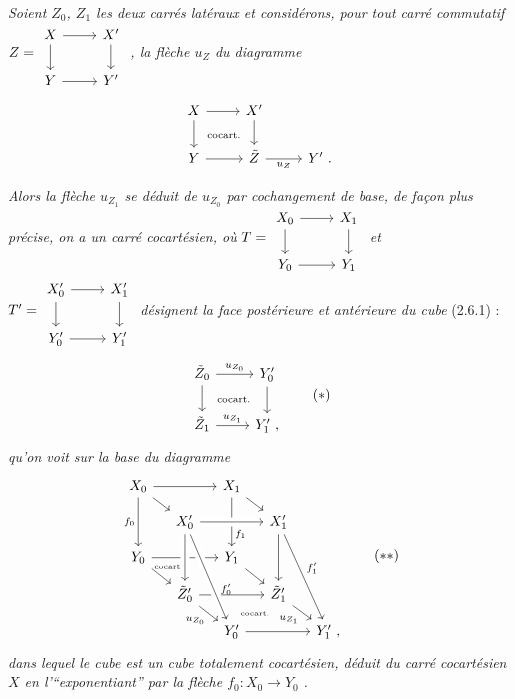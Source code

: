 \documentclass[11pt]{article}
\newcommand{\printedpage}[1]{\marginpar{\footnotesize p.~#1\ifstrequal{#1}{1}{\\[2pt]{[page 1]}}{}}}
\newcommand{\msp}[1]{\ifstrequal{#1}{page 1}{}{\marginpar{\footnotesize [#1]}}}
\begin{document}
\textit{Soient $Z_0$, $Z_1$ les deux carrés latéraux et considérons, pour tout carré commutatif}
$Z = \begin{tikzcd}[ampersand replacement=\&, baseline=(\tikzcdmatrixname.center)]
X \arrow[r] \arrow[d] \& X' \arrow[d] \\
Y \arrow[r] \& Y'
\end{tikzcd}$ \textit{, la flèche $u_Z$ du diagramme}
\[
\begin{tikzcd}
X \arrow[r] \arrow[d] \arrow[dr, phantom, "\text{\scriptsize cocart.}"] & X' \arrow[d] & \\
Y \arrow[r] & \tilde{Z} \arrow[r, "u_Z"'] & Y' \ .
\end{tikzcd}
\]

\printedpage{18}

\msp{page 32}

\textit{Alors la flèche $u_{Z_1}$ se déduit de $u_{Z_0}$ par cochangement de base, de façon plus précise, on a un carré cocartésien, où} $T = \begin{tikzcd}[ampersand replacement=\&, baseline=(\tikzcdmatrixname.center)]
X_0 \arrow[r] \arrow[d] \& X_1 \arrow[d] \\
Y_0 \arrow[r] \& Y_1
\end{tikzcd}$ \textit{et} $T' = \begin{tikzcd}[ampersand replacement=\&, baseline=(\tikzcdmatrixname.center)]
X'_0 \arrow[r] \arrow[d] \& X'_1 \arrow[d] \\
Y'_0 \arrow[r] \& Y'_1
\end{tikzcd}$ \textit{désignent la face postérieure et antérieure du cube} \textup{(2.6.1) :}
\[
\begin{tikzcd}
\tilde{Z}_0 \arrow[r, "u_{Z_0}"] \arrow[d] \arrow[dr, phantom, "\text{\scriptsize cocart.}"] & Y'_0 \arrow[d] \\
\tilde{Z}_1 \arrow[r, "u_{Z_1}"] & Y'_1 \ ,
\end{tikzcd}
\tag*{$(*)$}
\]
\textit{qu'on voit sur la base du diagramme}
\[
\begin{tikzcd}[row sep=small, column sep=small]
X_0 \arrow[rr] \arrow[dr] \arrow[dd, "f_0"'] & & X_1 \arrow[dr] \arrow[dd, "f_1" near end] & & \\
 & X'_0 \arrow[rr, crossing over] & & X'_1 \arrow[dd] \arrow[dddr, "f'_1"] & \\
Y_0 \arrow[rr] \arrow[dr] \arrow[dr, phantom, shift left=2ex, "\text{\tiny cocart.}"] & & Y_1 \arrow[dr] & & \\
 & \tilde{Z}'_0 \arrow[rr] \arrow[dr, "u_{Z_0}"'] \arrow[from=uu, crossing over] & & \tilde{Z}'_1 \arrow[dr, "u_{Z_1}"'] & \\
 & & Y'_0 \arrow[rr] \arrow[from=uuul, crossing over, "f'_0" near end] \arrow[ur, phantom, "\text{\tiny cocart.}"] & & Y'_1 \ ,
\end{tikzcd} %
\tag*{$(**)$}
\]
\textit{dans lequel le cube est un cube totalement cocartésien, déduit du carré cocartésien $X$ en l'“exponentiant” par la flèche $f_0 : X_0 \longrightarrow Y_0$} \textit{.}
\end{document}
